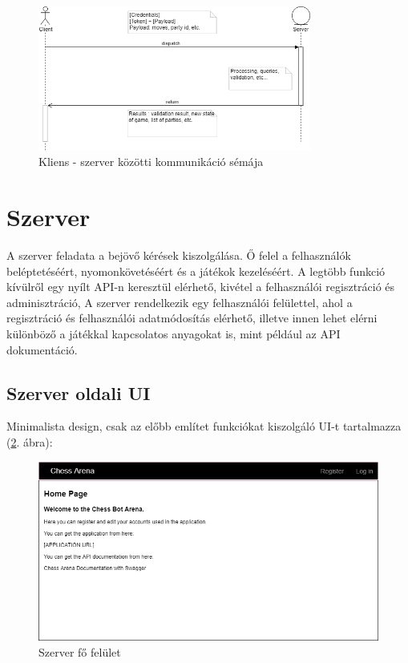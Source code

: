 \documentclass[twoside, a4paper, 12pt]{article}
\begin{document}
\begin{figure}[htbp]
	\centering
	\includegraphics[width=0.8\textwidth]{img/clientServerCommunication.png}
	\caption{Kliens - szerver közötti kommunikáció sémája}
	\label{fig:clientServerCommunication}
\end{figure}


\section{Szerver}
A szerver feladata a bejövő kérések kiszolgálása. Ő felel a felhasználók beléptetéséért, nyomonkövetéséért és a játékok kezeléséért. A legtöbb funkció kívülről egy nyílt API-n keresztül elérhető, kivétel a felhasználói regisztráció és adminisztráció,
A szerver rendelkezik egy felhasználói felülettel, ahol a regisztráció és felhasználói adatmódosítás elérhető, illetve innen lehet elérni különböző a játékkal kapcsolatos anyagokat is, mint például az API dokumentáció.

\subsection{Szerver oldali UI}
Minimalista design, csak az előbb említet funkciókat kiszolgáló UI-t tartalmazza (\ref{fig:serverUiMainScreen}. ábra):

\begin{figure}[htbp]
	\centering
	\includegraphics[width=1.0\textwidth]{img/serverUiMainScreen.png}
	\caption{Szerver fő felület}
	\label{fig:serverUiMainScreen}
\end{figure}
\end{document}
